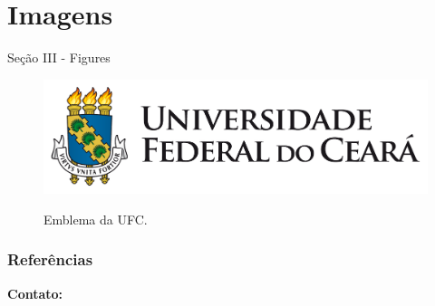 \documentclass{libs/ufc_format}
\begin{document}
\section{Imagens}
\begin{frame}{Seção III - Figures}
    \begin{figure}
        \centering
        \caption{Emblema da UFC.}
        \includegraphics[scale=0.3]{libs/emblemufc.pdf}
        \label{fig:ufc_emblem}
    \end{figure}
\end{frame}

\begin{frame}[allowframebreaks]
    \frametitle{Referências}
    \printbibliography
\end{frame}

\begin{frame}{}
    \centering
    \huge{\textbf{}}
    
    \vspace{1cm}
    
    \Large{\textbf{Contato:}}
    \newline
    \vspace*{0.5cm}
    \large{}
\end{frame}
\end{document}

